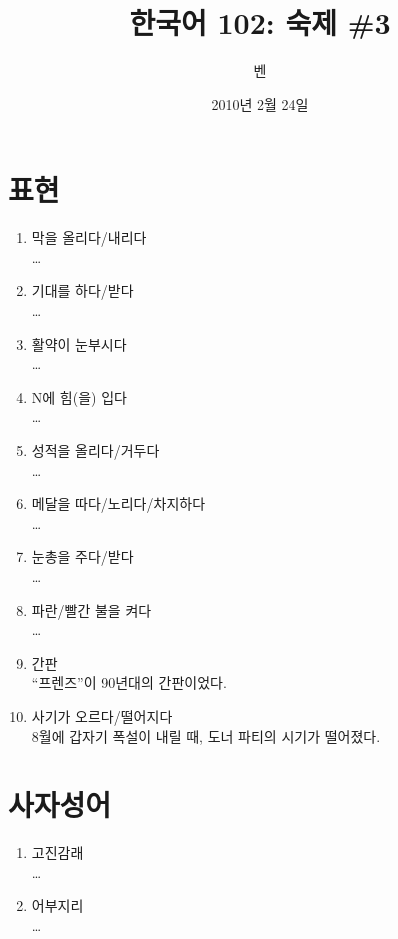 \documentclass[11pt]{article}
\title{한국어 102: 숙제 \#3}
\author{벤}
\date{2010년 2월 24일}
\begin{document}
\maketitle
\thispagestyle{empty}
\pagestyle{empty}

\section{표현}
\begin{enumerate}
  \item 막을 올리다/내리다 \\
    \ldots
  \item 기대를 하다/받다 \\
    \ldots
  \item 활약이 눈부시다 \\
    \ldots
  \item N에 힘(을) 입다 \\
    \ldots
  \item 성적을 올리다/거두다 \\
    \ldots
  \item 메달을 따다/노리다/차지하다 \\
    \ldots
  \item 눈총을 주다/받다 \\
    \ldots
  \item 파란/빨간 불을 켜다 \\
    \ldots
  \item 간판 \\
    ``프렌즈''이 90년대의 간판이었다.
  \item 사기가 오르다/떨어지다 \\
    8월에 갑자기 폭설이 내릴 때, 도너 파티의 시기가 떨어졌다.
\end{enumerate}

\section{사자성어}
\begin{enumerate}
  \item 고진감래 \\
    \ldots
  \item 어부지리 \\
    \ldots
\end{enumerate}
\end{document}
